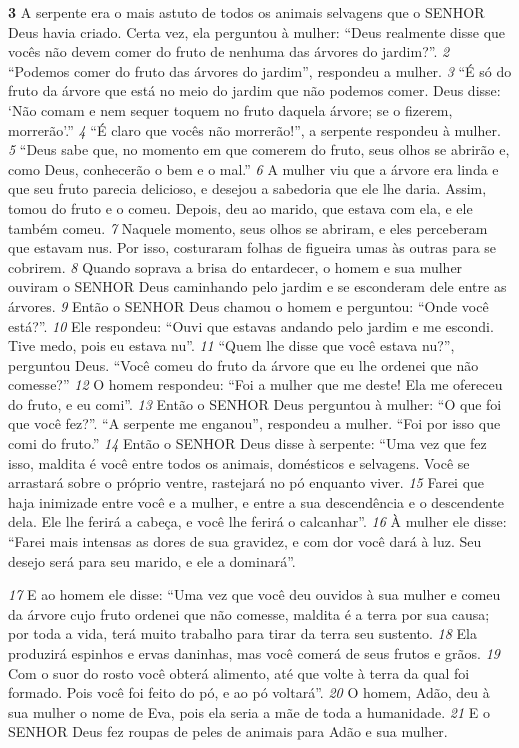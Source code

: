 \bigskip
\textbf{\large 3}
A serpente era o mais astuto de todos os animais selvagens que o SENHOR
Deus havia criado. Certa vez, ela perguntou à mulher: “Deus realmente disse que
vocês não devem comer do fruto de nenhuma das árvores do jardim?”.
\textit{\tiny 2}
“Podemos comer do fruto das árvores do jardim”, respondeu a mulher. 
\textit{\tiny 3}
“É só
do fruto da árvore que está no meio do jardim que não podemos comer. Deus
disse: ‘Não comam e nem sequer toquem no fruto daquela árvore; se o fizerem,
morrerão’.”
\textit{\tiny 4}
“É claro que vocês não morrerão!”, a serpente respondeu à mulher. 
\textit{\tiny 5}
“Deus
sabe que, no momento em que comerem do fruto, seus olhos se abrirão e, como
Deus, conhecerão o bem e o mal.”
\textit{\tiny 6}
A mulher viu que a árvore era linda e que seu fruto parecia delicioso, e desejou
a sabedoria que ele lhe daria. Assim, tomou do fruto e o comeu. Depois, deu ao
marido, que estava com ela, e ele também comeu. 
\textit{\tiny 7}
Naquele momento, seus olhos
se abriram, e eles perceberam que estavam nus. Por isso, costuraram folhas de
figueira umas às outras para se cobrirem.
\textit{\tiny 8}
Quando soprava a brisa do entardecer, o homem e sua mulher ouviram o
SENHOR Deus caminhando pelo jardim e se esconderam dele entre as árvores.
\textit{\tiny 9}
Então o SENHOR Deus chamou o homem e perguntou: “Onde você está?”.
\textit{\tiny 10}
Ele respondeu: “Ouvi que estavas andando pelo jardim e me escondi. Tive
medo, pois eu estava nu”.
\textit{\tiny 11}
“Quem    lhe disse que você estava nu?”, perguntou Deus. “Você comeu do
fruto da árvore que eu lhe ordenei que não comesse?”
\textit{\tiny 12}
O homem respondeu: “Foi a mulher que me deste! Ela me ofereceu do fruto,
e eu comi”.
\textit{\tiny 13}
Então o SENHOR Deus perguntou à mulher: “O que foi que você fez?”.
   “A serpente me enganou”, respondeu a mulher. “Foi por isso que comi do
fruto.”
\textit{\tiny 14}
Então o SENHOR Deus disse à serpente:
  “Uma vez que fez isso, maldita é você
     entre todos os animais, domésticos e selvagens.
  Você se arrastará sobre o próprio ventre,
     rastejará no pó enquanto viver.
\textit{\tiny 15}
Farei que haja inimizade entre você e a mulher,
     e entre a sua descendência e o descendente dela.
  Ele lhe ferirá a cabeça,
     e você lhe ferirá o calcanhar”.
\textit{\tiny 16}
À mulher ele disse:
  “Farei mais intensas as dores de sua gravidez,
    e com dor você dará à luz.
  Seu desejo será para seu marido,
    e ele a dominará”.

\bigskip
\textit{\tiny 17}
E ao homem ele disse:
  “Uma vez que você deu ouvidos à sua mulher
    e comeu da árvore cujo fruto ordenei que não comesse,
  maldita é a terra por sua causa;
    por toda a vida, terá muito trabalho para tirar da terra seu sustento.
\textit{\tiny 18}
Ela produzirá espinhos e ervas daninhas,
    mas você comerá de seus frutos e grãos.
\textit{\tiny 19}
Com o suor do rosto você obterá alimento,
    até que volte à terra da qual foi formado.
  Pois você foi feito do pó,
    e ao pó voltará”.
\textit{\tiny 20}
O homem, Adão, deu à sua mulher o nome de Eva, pois ela seria a mãe de toda
a humanidade.  
\textit{\tiny 21}
E o SENHOR Deus fez roupas de peles de animais para Adão e sua
mulher.

